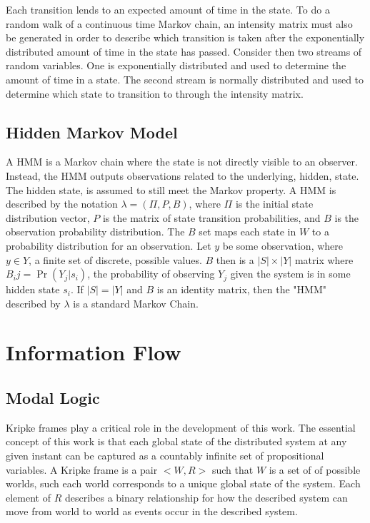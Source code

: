 Each transition lends to an expected amount of time in the state.
To do a random walk of a continuous time Markov chain, an intensity matrix must also be generated in order to describe which transition is taken after the exponentially distributed amount of time in the state has passed.
Consider then two streams of random variables.
One is exponentially distributed and used to determine the amount of time in a state.
The second stream is normally distributed and used to determine which state to transition to through the intensity matrix.

\subsection{Hidden Markov Model}

A \ac{HMM} is a Markov chain where the state is not directly visible to an observer.
Instead, the \ac{HMM} outputs observations related to the underlying, hidden, state.
The hidden state, is assumed to still meet the Markov property.
A \ac{HMM} is described by the notation $\lambda = (\Pi, P, B)$, where $\Pi$ is the initial state distribution vector, $P$ is the matrix of state transition probabilities, and $B$ is the observation probability distribution.
The $B$ set maps each state in $W$ to a probability distribution for an observation.
Let $y$ be some observation, where $y \in Y$, a finite set of discrete, possible values.
$B$ then is a $|S|\times|Y|$ matrix where $B_ij = \Pr(Y_j|s_i)$, the probability of observing $Y_j$ given the system is in some hidden state $s_i$.
If $|S|=|Y|$ and $B$ is an identity matrix, then the "\ac{HMM}" described by $\lambda$ is a standard Markov Chain.

\section{Information Flow}

\subsection{Modal Logic}

Kripke frames\cite{kripke1959}\cite{blackburn2002modal} play a critical role in the development of this work.
The essential concept of this work is that each global state of the distributed system at any given instant can be captured as a countably infinite set of propositional variables.
A Kripke frame is a pair $<W,R>$\cite{french2006} such that $W$ is a set of of possible worlds, such each world corresponds to a unique global state of the system.
Each element of $R$ describes a binary relationship for how the described system can move from world to world as events occur in the described system.

